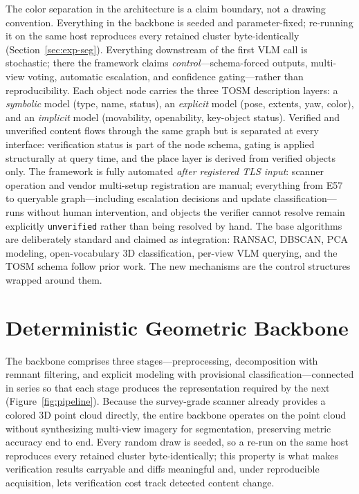 The color separation in the architecture is a claim boundary, not a drawing
convention. Everything in the backbone is seeded and parameter-fixed;
re-running it on the same host reproduces every retained cluster
byte-identically (Section~\ref{sec:exp-seg}). Everything downstream of the
first VLM call is stochastic; there the framework claims
\emph{control}---schema-forced outputs, multi-view voting, automatic
escalation, and confidence gating---rather than reproducibility. Each object
node carries the three TOSM description layers: a \emph{symbolic} model (type,
name, status), an \emph{explicit} model (pose, extents, yaw, color), and an
\emph{implicit} model (movability, openability, key-object status). Verified
and unverified content flows through the same graph but is separated at every
interface: verification status is part of the node schema, gating is applied
structurally at query time, and the place layer is derived from verified
objects only. The framework is fully automated \emph{after registered TLS
input}: scanner operation and vendor multi-setup registration are manual;
everything from E57 to queryable graph---including escalation decisions and
update classification---runs without human intervention, and objects the
verifier cannot resolve remain explicitly \texttt{unverified} rather than
being resolved by hand. The base algorithms are deliberately standard and
claimed as integration: RANSAC, DBSCAN, PCA modeling, open-vocabulary 3D
classification, per-view VLM querying, and the TOSM schema follow prior work.
The new mechanisms are the control structures wrapped around them.

\section{Deterministic Geometric Backbone}
\label{sec:backbone}

The backbone comprises three stages---preprocessing, decomposition with
remnant filtering, and explicit modeling with provisional
classification---connected in series so that each stage produces the
representation required by the next (Figure~\ref{fig:pipeline}). Because the
survey-grade scanner already provides a colored 3D point cloud directly, the
entire backbone operates on the point cloud without synthesizing multi-view
imagery for segmentation, preserving metric accuracy end to end. Every random
draw is seeded, so a re-run on the same host reproduces every retained cluster
byte-identically; this property is what makes verification results carryable
and diffs meaningful and, under reproducible acquisition, lets verification
cost track detected content change.

